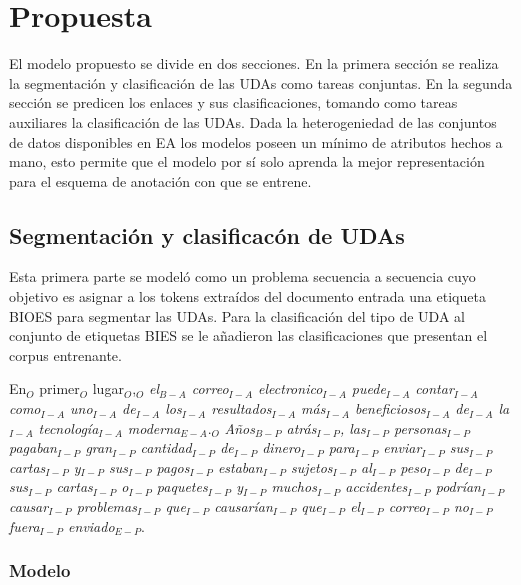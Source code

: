 \chapter{Propuesta}\label{chapter:proposal}

El modelo propuesto se divide en dos secciones. En la primera sección se realiza la segmentación y clasificación de 
las UDAs como tareas conjuntas. En la segunda sección se predicen los enlaces y sus clasificaciones, tomando
como tareas auxiliares la clasificación de las UDAs. Dada la heterogeniedad de las conjuntos de datos disponibles 
en EA los modelos poseen un mínimo de atributos hechos a mano, esto permite que el modelo por sí solo aprenda 
la mejor representación para el esquema de anotación con que se entrene.

\section{Segmentación y clasificacón de UDAs}

Esta primera parte se modeló como un problema secuencia a secuencia cuyo objetivo es asignar a los tokens 
extraídos del documento entrada una etiqueta BIOES para segmentar las UDAs. Para la clasificación del tipo 
de UDA al conjunto de etiquetas BIES se le añadieron las clasificaciones que presentan el corpus entrenante.

\begin{center}
    En$_O$ primer$_O$ lugar$_O$,$_O$ \emph{el$_{B-A}$ correo$_{I-A}$ electronico$_{I-A}$ puede$_{I-A}$ 
    contar$_{I-A}$ como$_{I-A}$ uno$_{I-A}$ de$_{I-A}$ los$_{I-A}$ resultados$_{I-A}$
    más$_{I-A}$ beneficiosos$_{I-A}$ de$_{I-A}$ la$_{I-A}$ tecnología$_{I-A}$ moderna$_{E-A}$}.$_{O}$ 
    \emph{Años$_{B-P}$ atrás$_{I-P}$, las$_{I-P}$ personas$_{I-P}$ pagaban$_{I-P}$ gran$_{I-P}$ cantidad$_{I-P}$ 
    de$_{I-P}$ dinero$_{I-P}$ para$_{I-P}$ enviar$_{I-P}$ sus$_{I-P}$ cartas$_{I-P}$ y$_{I-P}$ sus$_{I-P}$ 
    pagos$_{I-P}$ estaban$_{I-P}$ sujetos$_{I-P}$ al$_{I-P}$ peso$_{I-P}$ de$_{I-P}$ sus$_{I-P}$ 
    cartas$_{I-P}$ o$_{I-P}$ paquetes$_{I-P}$ y$_{I-P}$ muchos$_{I-P}$ accidentes$_{I-P}$ podrían$_{I-P}$
    causar$_{I-P}$ problemas$_{I-P}$ que$_{I-P}$ causarían$_{I-P}$ que$_{I-P}$ el$_{I-P}$ correo$_{I-P}$ 
    no$_{I-P}$ fuera$_{I-P}$ enviado$_{E-P}$}.
\end{center}

\subsection{Modelo}


